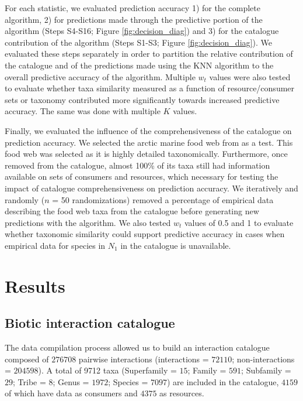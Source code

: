 For each statistic, we evaluated prediction accuracy 1) for the complete algorithm, 2) for predictions made through the predictive portion of the algorithm (Steps S4-S16; Figure \ref{fig:decision_diag}) and 3) for the catalogue contribution of the algorithm (Steps S1-S3; Figure \ref{fig:decision_diag}). We evaluated these steps separately in order to partition the relative contribution of the catalogue and of the predictions made using the KNN algorithm to the overall predictive accuracy of the algorithm. Multiple $w_t$ values were also tested to evaluate whether taxa similarity measured as a function of resource/consumer sets or taxonomy contributed more significantly towards increased predictive accuracy. The same was done with multiple $K$ values.

Finally, we evaluated the influence of the comprehensiveness of the catalogue on prediction accuracy. We selected the arctic marine food web from \citet{kortsch2015} as a test. This food web was selected as it is highly detailed taxonomically. Furthermore, once removed from the catalogue, almost 100\% of its taxa still had information available on sets of consumers and resources, which necessary for testing the impact of catalogue comprehensiveness on prediction accuracy. We iteratively and randomly ($n$ = 50 randomizations) removed a percentage of empirical data describing the food web taxa from the catalogue before generating new predictions with the algorithm. We also tested $w_t$ values of 0.5 and 1 to evaluate whether taxonomic similarity could support predictive accuracy in cases when empirical data for species in $N_1$ in the catalogue is unavailable.

\section{Results}
    \subsection{Biotic interaction catalogue}
The data compilation process allowed us to build an interaction catalogue composed of $276708$ pairwise interactions (interactions = $72110$; non-interactions = $204598$). A total of 9712 taxa (Superfamily = $15$; Family = $591$; Subfamily = $29$; Tribe = $8$; Genus = $1972$; Species = $7097$) are included in the catalogue, $4159$ of which have data as consumers and $4375$ as resources.

